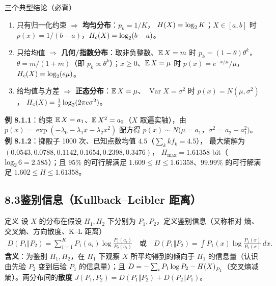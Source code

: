 \begin{thmbox}{三个典型结论（必背）}
\begin{enumerate}[leftmargin=1.5em,itemsep=1pt,topsep=2pt]
\item 只有归一化约束 $\Rightarrow$ \textbf{均匀分布}：$p_k=1/K$，
      $H\!\left(X\right)=\log_{2} K$；$X\in[a,b]$ 时 $p(x)=1/(b-a)$，$H_{c}\!\left(X\right)=\log_{2}(b-a)$。
\item 只给均值 $\Rightarrow$ \textbf{几何/指数分布}：取非负整数、$\operatorname{\mathbb{E}} X=m$
      时 $p_k=(1-\theta)\theta^{k}$，$\theta=m/(1+m)$（即
      $p_k\propto\theta^{k}$）；$x\ge0$、$\operatorname{\mathbb{E}} X=\mu$ 时
      $p(x)=e^{-x/\mu}/\mu$，$H_{c}\!\left(X\right)=\log_2(e\mu)$。
\item 给均值与方差 $\Rightarrow$ \textbf{正态分布}：$\operatorname{\mathbb{E}} X=\mu$、
      $\operatorname{Var}X=\sigma^{2}$ 时 $p(x)=N(\mu,\sigma^{2})$，
      $H_{c}\!\left(X\right)=\tfrac12\log_{2}(2\pi e\sigma^{2})$。
\end{enumerate}
\end{thmbox}

\textbf{例 8.1.1}：约束 $\operatorname{\mathbb{E}} X=a_1$、$\operatorname{\mathbb{E}} X^2=a_2$（$X$ 取遍实轴），由
$p(x)=\exp(-\lambda_0-\lambda_1x-\lambda_2x^{2})$ 配方得
$p(x)\sim N(\mu=a_1$，$\sigma^{2}=a_2-a_1^{2})$。
\textbf{例 8.1.2}：掷骰子 1000 次、已知点数均值 $4.5$（$\sum_kkf_k=4.5$），
最大熵解为 $(0.0543,0.0788,0.1142,0.1654,0.2398,0.3476)$，
$H_{\max}=1.61358$ bit（$\log_{2}6=2.585$）；且 $95\%$ 的可行解满足
$1.609\le H\le1.61358$、$99.99\%$ 的可行解满足 $1.602\le H\le1.61358$。

\subsection{8.3\quad 鉴别信息（Kullback--Leibler 距离）}

\begin{defbox}{定义}
设 $X$ 的分布在假设 $H_1,H_2$ 下分别为 $P_1,P_2$，定义鉴别信息（又称相对
熵、交叉熵、方向散度、K--L 距离）
\begin{align*}
D(P_1\Vert P_2)=\sum_{i=1}^{K}P_1(a_i)\log\frac{P_1(a_i)}{P_2(a_i)}
\quad\text{或}\quad
D(P_1\Vert P_2)=\int P_1(x)\log\frac{P_1(x)}{P_2(x)}\,dx .
\end{align*}
\textbf{含义}：为鉴别 $H_1,H_2$，在 $H_1$ 下观察 $X$ 所平均得到的倾向于
$H_1$ 的信息量（认识由先验 $P_2$ 变到后验 $P_1$ 的信息量）；且
$D=-\sum_iP_1\log P_2-H\!\left(X\right)_{P_1}$（交叉熵减熵）。两分布间的\textbf{散度}
$J(P_1,P_2)=D(P_1\Vert P_2)+D(P_2\Vert P_1)$。
\end{defbox}


